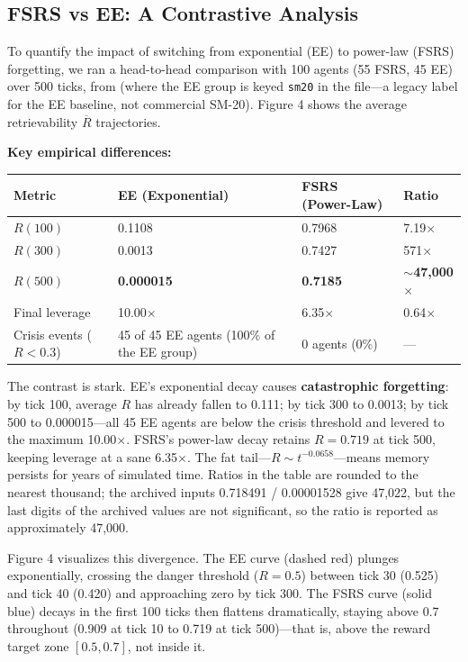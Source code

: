 \documentclass[11pt]{article}
\begin{document}
\subsection{FSRS vs EE: A Contrastive Analysis}
To quantify the impact of switching from exponential (EE) to power-law (FSRS) forgetting, we ran a head-to-head comparison with 100 agents (55 FSRS, 45 EE) over 500 ticks, from  (where the EE group is keyed \texttt{sm20} in the file---a legacy label for the EE baseline, not commercial SM-20). Figure 4 shows the average retrievability $\overline{R}$ trajectories.

\textbf{Key empirical differences:}

\begin{table}[htbp]
\centering
\begin{tabular}{llll}
\toprule
\textbf{Metric} & \textbf{EE (Exponential)} & \textbf{FSRS (Power-Law)} & \textbf{Ratio} \\
\midrule
$R(100)$ & 0.1108 & 0.7968 & 7.19$\times$ \\
$R(300)$ & 0.0013 & 0.7427 & 571$\times$ \\
$R(500)$ & \textbf{0.000015} & \textbf{0.7185} & \textbf{$\sim$47,000$\times$} \\
Final leverage & 10.00$\times$ & 6.35$\times$ & 0.64$\times$ \\
Crisis events ($R<0.3$) & 45 of 45 EE agents (100\% of the EE group) & 0 agents (0\%) & --- \\
\bottomrule
\end{tabular}
\end{table}

The contrast is stark. EE's exponential decay causes \textbf{catastrophic forgetting}: by tick 100, average $R$ has already fallen to 0.111; by tick 300 to 0.0013; by tick 500 to 0.000015---all 45 EE agents are below the crisis threshold and levered to the maximum 10.00$\times$. FSRS's power-law decay retains $R=0.719$ at tick 500, keeping leverage at a sane 6.35$\times$. The fat tail---$R \sim t^{-0.0658}$---means memory persists for years of simulated time. Ratios in the table are rounded to the nearest thousand; the archived inputs 0.718491 / 0.00001528 give 47,022, but the last digits of the archived values are not significant, so the ratio is reported as approximately 47,000.

Figure 4 visualizes this divergence. The EE curve (dashed red) plunges exponentially, crossing the danger threshold ($R=0.5$) between tick 30 (0.525) and tick 40 (0.420) and approaching zero by tick 300. The FSRS curve (solid blue) decays in the first 100 ticks then flattens dramatically, staying above 0.7 throughout (0.909 at tick 10 to 0.719 at tick 500)---that is, above the reward target zone $[0.5, 0.7]$, not inside it.
\end{document}
